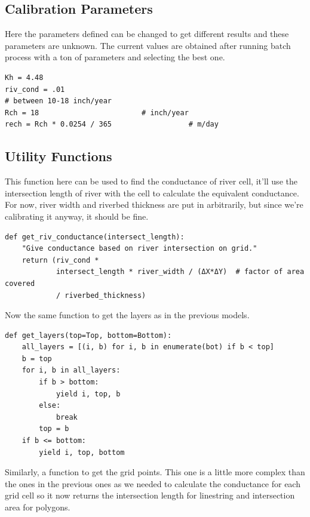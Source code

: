 \documentclass[titlepage,12pt]{unisubmission}
\begin{document}
\subsection{Calibration Parameters}
\label{sec:org862f54b}

Here the parameters defined can be changed to get different results and these parameters are unknown. The current values are obtained after running batch process with a ton of parameters and selecting the best one.

\begin{verbatim}
Kh = 4.48
riv_cond = .01
# between 10-18 inch/year
Rch = 18                        # inch/year
rech = Rch * 0.0254 / 365                  # m/day
\end{verbatim}

\subsection{Utility Functions}
\label{sec:org8b62ded}

This function here can be used to find the conductance of river cell, it'll use the intersection length of river with the cell to calculate the equivalent conductance. For now, river width and riverbed thickness are put in arbitrarily, but since we're calibrating it anyway, it should be fine.

\begin{verbatim}
def get_riv_conductance(intersect_length):
    "Give conductance based on river intersection on grid."
    return (riv_cond *
            intersect_length * river_width / (ΔX*ΔY)  # factor of area covered
            / riverbed_thickness)
\end{verbatim}

Now the same function to get the layers as in the previous models.

\begin{verbatim}
def get_layers(top=Top, bottom=Bottom):
    all_layers = [(i, b) for i, b in enumerate(bot) if b < top]
    b = top
    for i, b in all_layers:
        if b > bottom:
            yield i, top, b
        else:
            break
        top = b
    if b <= bottom:
        yield i, top, bottom
\end{verbatim}


Similarly, a function to get the grid points. This one is a little more complex than the ones in the previous ones as we needed to calculate the conductance for each grid cell so it now returns the intersection length for linestring and intersection area for polygons.
\end{document}
